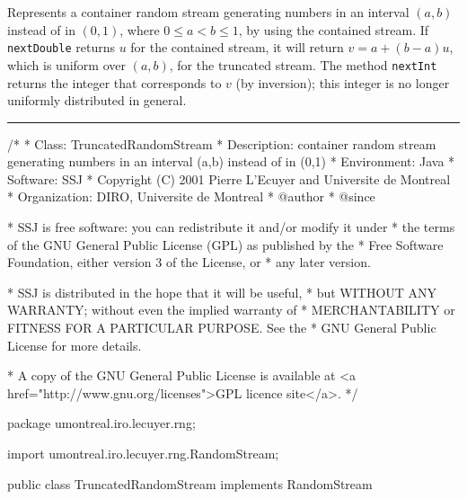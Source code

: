 
Represents a container random stream generating numbers in an interval 
$(a,b)$ instead of in $(0,1)$, where $0\le a < b \le 1$, 
by using the contained stream.
If \texttt{nextDouble} returns $u$ for the contained stream,
it will return $v = a + (b-a)u$, which is uniform over $(a,b)$,
for the truncated stream.
The method \texttt{nextInt} returns the integer that corresponds to $v$
(by inversion); this integer is no longer uniformly distributed in general.

\bigskip\hrule

\begin{code}
\begin{hide}
/*
 * Class:        TruncatedRandomStream
 * Description:  container random stream generating numbers in an interval
                 (a,b) instead of in (0,1)
 * Environment:  Java
 * Software:     SSJ 
 * Copyright (C) 2001  Pierre L'Ecuyer and Universite de Montreal
 * Organization: DIRO, Universite de Montreal
 * @author       
 * @since

 * SSJ is free software: you can redistribute it and/or modify it under
 * the terms of the GNU General Public License (GPL) as published by the
 * Free Software Foundation, either version 3 of the License, or
 * any later version.

 * SSJ is distributed in the hope that it will be useful,
 * but WITHOUT ANY WARRANTY; without even the implied warranty of
 * MERCHANTABILITY or FITNESS FOR A PARTICULAR PURPOSE.  See the
 * GNU General Public License for more details.

 * A copy of the GNU General Public License is available at
   <a href="http://www.gnu.org/licenses">GPL licence site</a>.
 */
\end{hide}
package umontreal.iro.lecuyer.rng;\begin{hide}

import umontreal.iro.lecuyer.rng.RandomStream;
\end{hide}

public class TruncatedRandomStream implements RandomStream\begin{hide} {
   private RandomStream stream;
   private double a;
   private double bminusa;
\end{hide}
\end{code}

